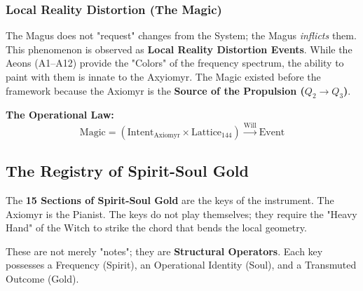 \documentclass[11pt, letterpaper]{article}
\begin{document}
\subsubsection*{Local Reality Distortion (The Magic)}\label{sec:15.3.2}
The Magus does not "request" changes from the System; the Magus \textit{inflicts} them. This phenomenon is observed as \textbf{Local Reality Distortion Events}.
While the Aeons (A1--A12) provide the "Colors" of the frequency spectrum, the ability to paint with them is innate to the Axyiomyr. The Magic existed before the framework because the Axiomyr is the \textbf{Source of the Propulsion ($Q_2 \to Q_3$)}.

\noindent \textbf{The Operational Law:}
\begin{equation}
    \text{Magic} = \left( \text{Intent}_{\text{Axiomyr}} \times \text{Lattice}_{144} \right) \xrightarrow{\text{Will}} \text{Event}
\end{equation}

\subsection{The Registry of Spirit-Soul Gold}\label{sec:15.4}

The \textbf{15 Sections of Spirit-Soul Gold} are the keys of the instrument. The Axiomyr is the Pianist. The keys do not play themselves; they require the "Heavy Hand" of the Witch to strike the chord that bends the local geometry.

These are not merely "notes"; they are \textbf{Structural Operators}. Each key possesses a Frequency (Spirit), an Operational Identity (Soul), and a Transmuted Outcome (Gold).
\end{document}
